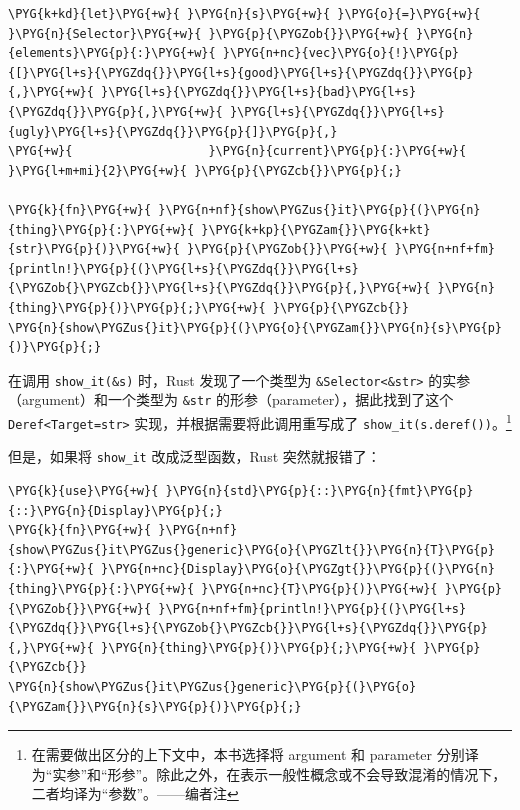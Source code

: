 \begin{Verbatim}[commandchars=\\\{\},breaklines=true,breakanywhere=true,fontsize=\codefont,xleftmargin=17bp]
\PYG{k+kd}{let}\PYG{+w}{ }\PYG{n}{s}\PYG{+w}{ }\PYG{o}{=}\PYG{+w}{ }\PYG{n}{Selector}\PYG{+w}{ }\PYG{p}{\PYGZob{}}\PYG{+w}{ }\PYG{n}{elements}\PYG{p}{:}\PYG{+w}{ }\PYG{n+nc}{vec}\PYG{o}{!}\PYG{p}{[}\PYG{l+s}{\PYGZdq{}}\PYG{l+s}{good}\PYG{l+s}{\PYGZdq{}}\PYG{p}{,}\PYG{+w}{ }\PYG{l+s}{\PYGZdq{}}\PYG{l+s}{bad}\PYG{l+s}{\PYGZdq{}}\PYG{p}{,}\PYG{+w}{ }\PYG{l+s}{\PYGZdq{}}\PYG{l+s}{ugly}\PYG{l+s}{\PYGZdq{}}\PYG{p}{]}\PYG{p}{,}
\PYG{+w}{                   }\PYG{n}{current}\PYG{p}{:}\PYG{+w}{ }\PYG{l+m+mi}{2}\PYG{+w}{ }\PYG{p}{\PYGZcb{}}\PYG{p}{;}

\PYG{k}{fn}\PYG{+w}{ }\PYG{n+nf}{show\PYGZus{}it}\PYG{p}{(}\PYG{n}{thing}\PYG{p}{:}\PYG{+w}{ }\PYG{k+kp}{\PYGZam{}}\PYG{k+kt}{str}\PYG{p}{)}\PYG{+w}{ }\PYG{p}{\PYGZob{}}\PYG{+w}{ }\PYG{n+nf+fm}{println!}\PYG{p}{(}\PYG{l+s}{\PYGZdq{}}\PYG{l+s}{\PYGZob{}\PYGZcb{}}\PYG{l+s}{\PYGZdq{}}\PYG{p}{,}\PYG{+w}{ }\PYG{n}{thing}\PYG{p}{)}\PYG{p}{;}\PYG{+w}{ }\PYG{p}{\PYGZcb{}}
\PYG{n}{show\PYGZus{}it}\PYG{p}{(}\PYG{o}{\PYGZam{}}\PYG{n}{s}\PYG{p}{)}\PYG{p}{;}
\end{Verbatim}

在调用 \texttt{show\_it(\&s)} 时，Rust 发现了一个类型为 \texttt{\&Selector<\&str>} 的实参（argument）和一个类型为 \texttt{\&str} 的形参（parameter），据此找到了这个 \texttt{Deref<Target=str>} 实现，并根据需要将此调用重写成了 \texttt{show\_it(s.deref())}。\footnote{在需要做出区分的上下文中，本书选择将 argument 和 parameter 分别译为“实参”和“形参”。除此之外，在表示一般性概念或不会导致混淆的情况下，二者均译为“参数”。——编者注}

但是，如果将 \texttt{show\_it} 改成泛型函数，Rust 突然就报错了：

\begin{Verbatim}[commandchars=\\\{\},breaklines=true,breakanywhere=true,fontsize=\codefont,xleftmargin=17bp]
\PYG{k}{use}\PYG{+w}{ }\PYG{n}{std}\PYG{p}{::}\PYG{n}{fmt}\PYG{p}{::}\PYG{n}{Display}\PYG{p}{;}
\PYG{k}{fn}\PYG{+w}{ }\PYG{n+nf}{show\PYGZus{}it\PYGZus{}generic}\PYG{o}{\PYGZlt{}}\PYG{n}{T}\PYG{p}{:}\PYG{+w}{ }\PYG{n+nc}{Display}\PYG{o}{\PYGZgt{}}\PYG{p}{(}\PYG{n}{thing}\PYG{p}{:}\PYG{+w}{ }\PYG{n+nc}{T}\PYG{p}{)}\PYG{+w}{ }\PYG{p}{\PYGZob{}}\PYG{+w}{ }\PYG{n+nf+fm}{println!}\PYG{p}{(}\PYG{l+s}{\PYGZdq{}}\PYG{l+s}{\PYGZob{}\PYGZcb{}}\PYG{l+s}{\PYGZdq{}}\PYG{p}{,}\PYG{+w}{ }\PYG{n}{thing}\PYG{p}{)}\PYG{p}{;}\PYG{+w}{ }\PYG{p}{\PYGZcb{}}
\PYG{n}{show\PYGZus{}it\PYGZus{}generic}\PYG{p}{(}\PYG{o}{\PYGZam{}}\PYG{n}{s}\PYG{p}{)}\PYG{p}{;}
\end{Verbatim}

